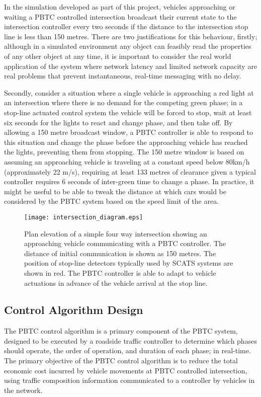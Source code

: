 In the simulation developed as part of this project, vehicles approaching or waiting a PBTC controlled intersection broadcast their current state to the intersection controller every two seconds if the distance to the intersection stop line is less than 150 metres. There are two justifications for this behaviour, firstly; although in a simulated environment any object can feasibly read the properties of any other object at any time, it is important to consider the real world application of the system where network latency and limited network capacity are real problems that prevent instantaneous, real-time messaging with no delay. 

Secondly, consider a situation where a single vehicle is approaching a red light at an intersection where there is no demand for the competing green phase; in a stop-line actuated control system the vehicle will be forced to stop, wait at least six seconds for the lights to react and change phase, and then take off. By allowing a 150 metre broadcast window, a PBTC controller is able to respond to this situation and change the phase before the approaching vehicle has reached the lights, preventing them from stopping. The 150 metre window is based on assuming an approaching vehicle is traveling at a constant speed below 80km/h (approximately 22 m/s), requiring at least 133 metres of clearance given a typical controller requires 6 seconds of inter-green time to change a phase. In practice, it might be useful to be able to tweak the distance at which cars would be considered by the PBTC system based on the speed limit of the area. 

\begin{figure}[]
\centering
	\texttt{[image: intersection\_diagram.eps]}
	\caption{ Plan elevation of a simple four way intersection showing an approaching vehicle communicating with a PBTC controller. The distance of initial communication is shown as 150 metres. The position of stop-line detectors typically used by SCATS systems are shown in red. The PBTC controller is able to adapt to vehicle actuations in advance of the vehicle arrival at the stop line. }
\label{intersectiondiagram}
\end{figure}

\subsection {Control Algorithm Design}

The PBTC control algorithm is a primary component of the PBTC system, designed to be executed by a roadside traffic controller to determine which phases should operate, the order of operation, and duration of each phase; in real-time. The primary objective of the PBTC control algorithm is to reduce the total economic cost incurred by vehicle movements  at PBTC controlled intersection, using traffic composition information communicated to a controller by vehicles in the network. 

